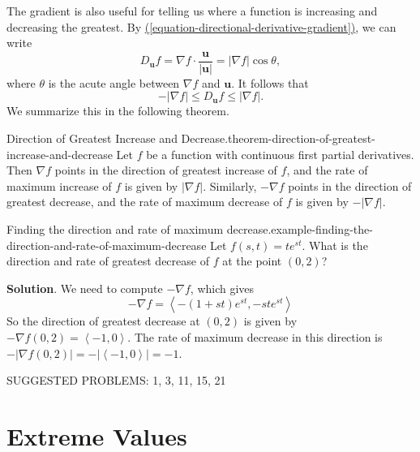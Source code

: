 \documentclass[10pt,]{book}
\numberwithin{equation}{section}
\newcommand{\vv}[1]{\mathbf{#1}}
\newcommand{\grad}{\nabla}
\newcommand{\dotprod}[1]{\left\langle #1 \right\rangle}
\begin{document}
\hypertarget{p-1411}{}%
The gradient is also useful for telling us where a function is increasing and decreasing the greatest. By \hyperref[equation-directional-derivative-gradient]{(\ref{equation-directional-derivative-gradient})}, we can write%
\begin{equation*}
D_{\vv{u}}f = \grad f\cdot\frac{\vv{u}}{|\vv{u}|} = |\grad f| \cos\theta,
\end{equation*}
where \(\theta\) is the acute angle between \(\grad f\) and \(\vv{u}\). It follows that%
\begin{equation*}
-|\grad f| \leq D_{\vv{u}}f \leq |\grad f|.
\end{equation*}
We summarize this in the following theorem.%
\begin{theorem}{Direction of Greatest Increase and Decrease.}{}{theorem-direction-of-greatest-increase-and-decrease}%
\hypertarget{p-1412}{}%
Let \(f\) be a function with continuous first partial derivatives. Then \(\grad f\) points in the direction of greatest increase of \(f\), and the rate of maximum increase of \(f\) is given by \(|\grad f|\). Similarly, \(-\grad f\) points in the direction of greatest decrease, and the rate of maximum decrease of \(f\) is given by \(-|\grad f|\).%
\end{theorem}
\begin{example}{Finding the direction and rate of maximum decrease.}{example-finding-the-direction-and-rate-of-maximum-decrease}%
\hypertarget{p-1413}{}%
Let \(f(s,t) = te^{st}\). What is the direction and rate of greatest decrease of \(f\) at the point \((0,2)\)?%
\par\smallskip%
\noindent\textbf{Solution}.\hypertarget{solution-230}{}\quad%
\hypertarget{p-1414}{}%
We need to compute \(-\grad f\), which gives%
\begin{equation*}
-\grad f = \dotprod{-(1 + st)e^{st}, -ste^{st}}
\end{equation*}
So the direction of greatest decrease at \((0,2)\) is given by \(-\grad f(0,2) = \dotprod{-1, 0}\). The rate of maximum decrease in this direction is \(-|\grad f(0,2)| = -|\dotprod{-1,0}| = -1\).%
\end{example}
\hypertarget{p-1415}{}%
SUGGESTED PROBLEMS: 1, 3, 11, 15, 21%
%
%
\typeout{************************************************}
\typeout{************************************************}
%
\section[{Extreme Values}]{Extreme Values}\label{section-extreme-values}
%
%
\typeout{************************************************}
\typeout{************************************************}
%
\end{document}
